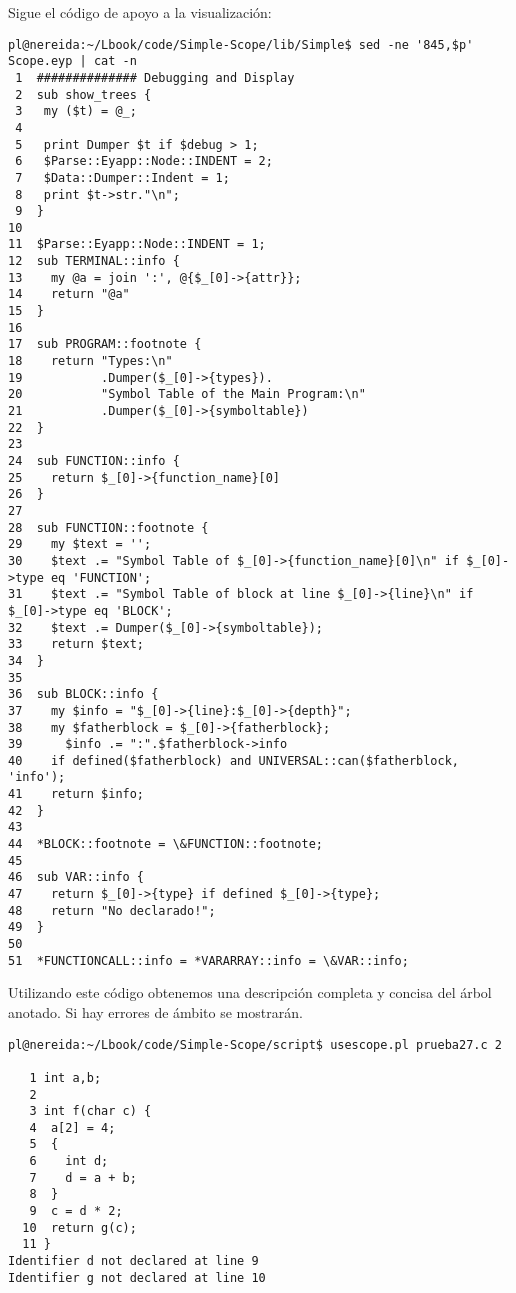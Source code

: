
Sigue el código de apoyo a la visualización:
\begin{verbatim}
pl@nereida:~/Lbook/code/Simple-Scope/lib/Simple$ sed -ne '845,$p' Scope.eyp | cat -n
 1  ############## Debugging and Display
 2  sub show_trees {
 3   my ($t) = @_;
 4
 5   print Dumper $t if $debug > 1;
 6   $Parse::Eyapp::Node::INDENT = 2;
 7   $Data::Dumper::Indent = 1;
 8   print $t->str."\n";
 9  }
10
11  $Parse::Eyapp::Node::INDENT = 1;
12  sub TERMINAL::info {
13    my @a = join ':', @{$_[0]->{attr}};
14    return "@a"
15  }
16
17  sub PROGRAM::footnote {
18    return "Types:\n"
19           .Dumper($_[0]->{types}).
20           "Symbol Table of the Main Program:\n"
21           .Dumper($_[0]->{symboltable})
22  }
23
24  sub FUNCTION::info {
25    return $_[0]->{function_name}[0]
26  }
27
28  sub FUNCTION::footnote {
29    my $text = '';
30    $text .= "Symbol Table of $_[0]->{function_name}[0]\n" if $_[0]->type eq 'FUNCTION';
31    $text .= "Symbol Table of block at line $_[0]->{line}\n" if $_[0]->type eq 'BLOCK';
32    $text .= Dumper($_[0]->{symboltable});
33    return $text;
34  }
35
36  sub BLOCK::info {
37    my $info = "$_[0]->{line}:$_[0]->{depth}";
38    my $fatherblock = $_[0]->{fatherblock};
39      $info .= ":".$fatherblock->info
40    if defined($fatherblock) and UNIVERSAL::can($fatherblock, 'info');
41    return $info;
42  }
43
44  *BLOCK::footnote = \&FUNCTION::footnote;
45
46  sub VAR::info {
47    return $_[0]->{type} if defined $_[0]->{type};
48    return "No declarado!";
49  }
50
51  *FUNCTIONCALL::info = *VARARRAY::info = \&VAR::info;
\end{verbatim}


Utilizando este código 
obtenemos una descripción completa y concisa 
del árbol anotado. Si hay errores de ámbito se mostrarán.

\begin{verbatim}
pl@nereida:~/Lbook/code/Simple-Scope/script$ usescope.pl prueba27.c 2

   1 int a,b;
   2
   3 int f(char c) {
   4  a[2] = 4;
   5  {
   6    int d;
   7    d = a + b;
   8  }
   9  c = d * 2;
  10  return g(c);
  11 }
Identifier d not declared at line 9
Identifier g not declared at line 10
\end{verbatim}


